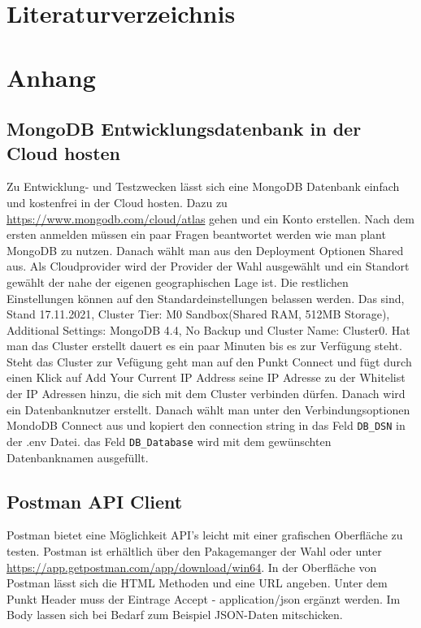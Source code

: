 \documentclass[12pt, a4paper, twoside]{article}
\begin{document}
\section{Literaturverzeichnis}


\renewcommand{\refname}{} 



\newpage


\appendix %
\section{Anhang}

\subsection{MongoDB Entwicklungsdatenbank in der Cloud hosten}

Zu Entwicklung- und Testzwecken lässt sich eine MongoDB Datenbank einfach und kostenfrei in der Cloud hosten. Dazu zu \url{https://www.mongodb.com/cloud/atlas} gehen und ein Konto erstellen. Nach dem ersten anmelden müssen ein paar Fragen beantwortet werden wie man plant MongoDB zu nutzen. Danach wählt man aus den Deployment Optionen Shared aus. Als Cloudprovider wird der Provider der Wahl ausgewählt und ein Standort gewählt der nahe der eigenen geographischen Lage ist. Die restlichen Einstellungen können auf den Standardeinstellungen belassen werden. Das sind, Stand 17.11.2021, Cluster Tier: M0 Sandbox(Shared RAM, 512MB Storage), Additional Settings: MongoDB 4.4, No Backup und Cluster Name: Cluster0. Hat man das Cluster erstellt dauert es ein paar Minuten bis es zur Verfügung steht. Steht das Cluster zur Vefügung geht man auf den Punkt Connect und fügt durch einen Klick auf Add Your Current IP Address seine IP Adresse zu der Whitelist der IP Adressen hinzu, die sich mit dem Cluster verbinden dürfen. Danach wird ein Datenbanknutzer erstellt. Danach wählt man unter den Verbindungsoptionen MondoDB Connect aus und kopiert den connection string in das Feld \texttt{DB_DSN} in der .env Datei. das Feld \texttt{DB_Database} wird mit dem gewünschten Datenbanknamen ausgefüllt.

\subsection{Postman API Client}

Postman bietet eine Möglichkeit API's leicht mit einer grafischen Oberfläche zu testen. Postman ist erhältlich über den Pakagemanger der Wahl oder unter \url{https://app.getpostman.com/app/download/win64}. In der Oberfläche von Postman lässt sich die HTML Methoden und eine URL angeben. Unter dem Punkt Header muss der Eintrage Accept - application/json ergänzt werden. Im Body lassen sich bei Bedarf zum Beispiel JSON-Daten mitschicken.
\end{document}
